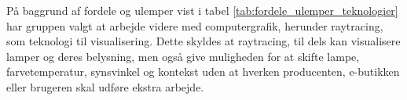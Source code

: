 På baggrund af fordele og ulemper vist i tabel \ref{tab:fordele_ulemper_teknologier} har gruppen valgt at arbejde videre med computergrafik, herunder raytracing, som teknologi til visualisering. Dette skyldes at raytracing, til dels kan visualisere lamper og deres belysning, men også give muligheden for at skifte lampe,  farvetemperatur, synsvinkel og kontekst uden at hverken producenten, e-butikken eller brugeren skal udføre ekstra arbejde. 



